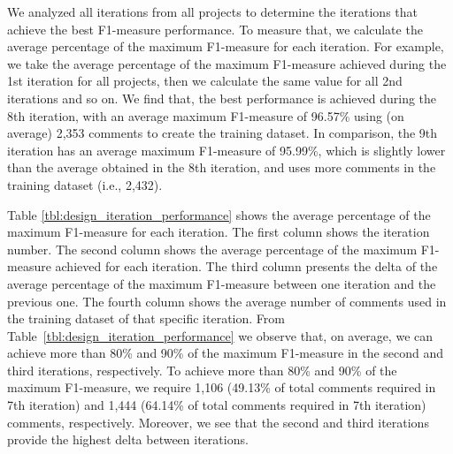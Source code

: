 
We analyzed all iterations from all projects to determine the iterations that achieve the best F1-measure performance. To measure that, we calculate the average percentage of the maximum F1-measure for each iteration. For example, we take the average percentage of the maximum F1-measure achieved during the 1st iteration for all projects, then we calculate the same value for all 2nd iterations and so on. We find that, the best performance is achieved during the 8th iteration, with an average maximum F1-measure of 96.57\% using (on average) 2,353 comments to create the training dataset. In comparison, the 9th iteration has an average  maximum F1-measure of 95.99\%, which is slightly lower than the average obtained in the 8th iteration, and uses more comments in the training dataset (i.e., 2,432).

Table \ref{tbl:design_iteration_performance} shows the average percentage of the maximum F1-measure for each iteration. The first column shows the iteration number. The second column shows the average percentage of the maximum F1-measure achieved for each iteration. The third column presents the delta of the average percentage of the maximum F1-measure between one iteration and the previous one. The fourth column shows the average number of comments used in the training dataset of that specific iteration. From Table~\ref{tbl:design_iteration_performance} we observe that, on average, we can achieve more than 80\% and 90\% of the maximum F1-measure in the second and third iterations, respectively. To achieve more than 80\% and 90\% of the maximum F1-measure, we require 1,106 (49.13\% of total comments required in 7th iteration) and 1,444 (64.14\% of total comments required in 7th iteration) comments, respectively. Moreover, we see that the second and third iterations provide the highest delta between iterations.

